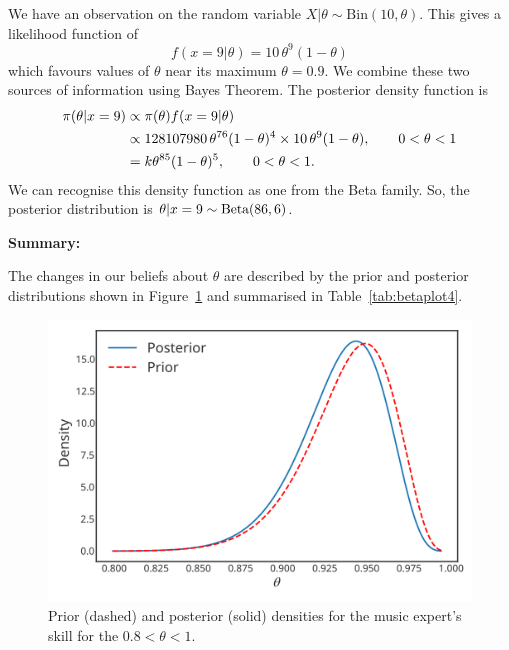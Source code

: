 {{}

\newpage


{
    We have an observation on the random variable $X|\theta\sim
        \text{Bin}(10,\theta)$. This gives a likelihood function of
        \begin{equation}
        f(x=9|\theta)=10\,\theta^9(1-\theta)
        \label{eq:p4}
        \end{equation}
        which favours values of $\theta$ near its maximum $\theta=0.9$. We combine these two sources of information using Bayes Theorem. The posterior density function is 
        \begin{align}
        \label{eq:p5}
        \pi(\theta|x=9)&\propto\pi(\theta)f(x=9|\theta) \notag \\
        &\propto 128107980\,\theta^{76}(1-\theta)^4\times 10\,\theta^9(1-\theta),
        \quad\quad 0<\theta<1 \notag \\
        &=k\theta^{85}(1-\theta)^5,\quad\quad 0<\theta<1.
        \end{align}
        We can recognise this density function as one from the Beta family. So, the posterior distribution is $\theta|x=9\sim
        \textnormal{\text{Beta}}(86,6)$.
        
    
}

\textbf{Summary:}

The changes in our beliefs about $\theta$ are described by the prior and posterior distributions shown in Figure~\ref{fig:betaplot4} and summarised in Table~\ref{tab:betaplot4}.
\begin{figure}[h!]

\includegraphics{images/priorposterior1.svg}
\caption{Prior (dashed) and posterior (solid) densities for the music expert's skill for the $0.8 < \theta < 1$.}
\label{fig:betaplot4}


\end{figure}}
